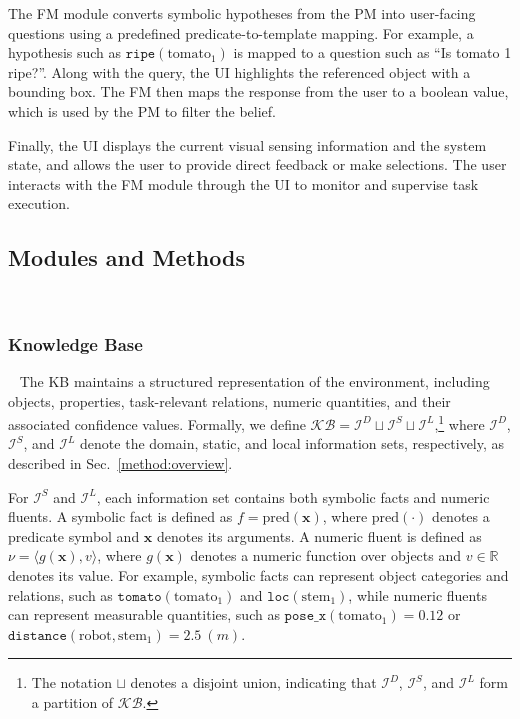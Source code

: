 The FM module converts symbolic hypotheses from the PM into user-facing questions using a predefined predicate-to-template mapping. For example, a hypothesis such as $\texttt{ripe}(\text{tomato}_1)$ is mapped to a question such as ``Is tomato 1 ripe?''. Along with the query, the UI highlights the referenced object with a bounding box. The FM then maps the response from the user to a boolean value, which is used by the PM to filter the belief.

Finally, the UI displays the current visual sensing information and the system state, and allows the user to provide direct feedback or make selections. The user interacts with the FM module through the UI to monitor and supervise task execution.




\subsection{Modules and Methods}~\label{method:modules}
\subsubsection{Knowledge Base}~\label{method:KB}
The KB maintains a structured representation of the environment, including objects, properties, task-relevant relations, numeric quantities, and their associated confidence values. Formally, we define $\mathcal{KB} = \mathcal{I}^{D} \sqcup \mathcal{I}^{S} \sqcup \mathcal{I}^{L}$,\footnote{The notation $\sqcup$ denotes a disjoint union, indicating that $\mathcal{I}^{D}$, $\mathcal{I}^{S}$, and $\mathcal{I}^{L}$ form a partition of $\mathcal{KB}$.} where $\mathcal{I}^{D}$, $\mathcal{I}^{S}$, and $\mathcal{I}^{L}$ denote the domain, static, and local information sets, respectively, as described in Sec.~\ref{method:overview}.

For $\mathcal{I}^{S}$ and $\mathcal{I}^{L}$, each information set contains both symbolic facts and numeric fluents. A symbolic fact is defined as $f = \text{pred}(\mathbf{x})$, where $\text{pred}(\cdot)$ denotes a predicate symbol and $\mathbf{x}$ denotes its arguments. A numeric fluent is defined as $\nu = \langle g(\mathbf{x}), v \rangle$, where $g(\mathbf{x})$ denotes a numeric function over objects and $v \in \mathbb{R}$ denotes its value. For example, symbolic facts can represent object categories and relations, such as $\texttt{tomato}(\text{tomato}_1)$ and $\texttt{loc}(\text{stem}_1)$, while numeric fluents can represent measurable quantities, such as $\texttt{pose\_x}(\text{tomato}_1)=0.12$ or $\texttt{distance}(\text{robot}, \text{stem}_1)=2.5\ (m)$.


